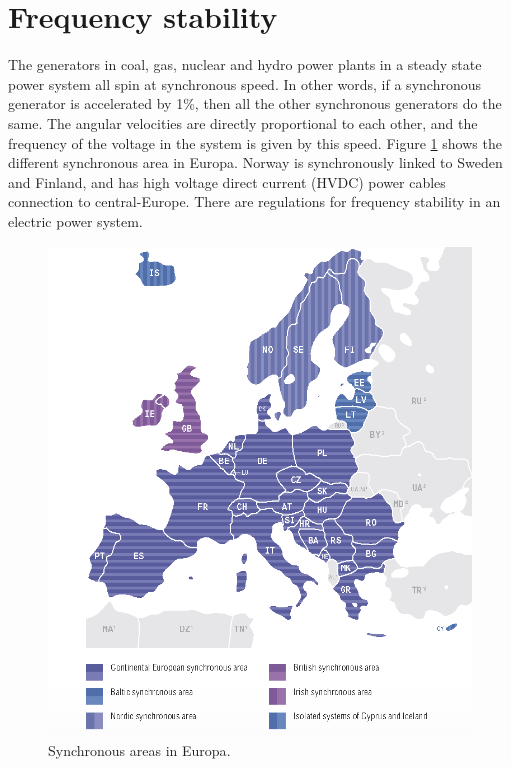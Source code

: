 \documentclass[class=book, crop=false]{standalone}
\begin{document}
\section{Frequency stability}
The generators in coal, gas, nuclear and hydro power plants in a steady state power system all spin at synchronous speed. In other words, if a synchronous generator is accelerated by 1\%, then all the other synchronous generators do the same. The angular velocities are directly proportional to each other, and the frequency of the voltage in the system is given by this speed. Figure \ref{fig:theory:entso-synchronous-area} shows the different synchronous area in Europa. Norway is synchronously linked to Sweden and Finland, and has high voltage direct current (HVDC) power cables connection to central-Europe. There are regulations for frequency stability in an electric power system.

\begin{figure}[H]
    \center
    \includegraphics[height=13cm, width=14cm]{figures/ENTSO-E-member-states.png}
    \caption[size = 9]{Synchronous areas in Europa\cite{synchronous_regions}.}
    \label{fig:theory:entso-synchronous-area}
\end{figure}
\end{document}
